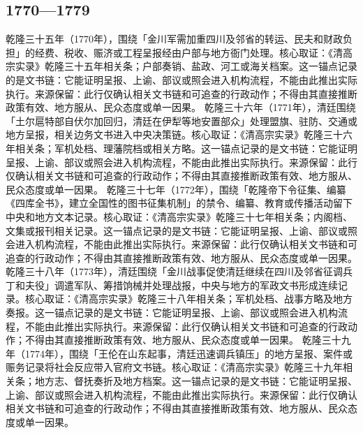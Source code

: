 \subsection{1770—1779}
乾隆三十五年（1770年），围绕「金川军需加重四川及邻省的转运、民夫和财政负担」的经费、税收、赈济或工程呈报经由户部与地方衙门处理。核心取证：《清高宗实录》乾隆三十五年相关条；户部奏销、盐政、河工或海关档案。这一锚点记录的是文书链：它能证明呈报、上谕、部议或照会进入机构流程，不能由此推出实际执行。来源保留：此行仅确认相关文书链和可追查的行政动作；不得由其直接推断政策有效、地方服从、民众态度或单一因果。
乾隆三十六年（1771年），清廷围绕「土尔扈特部自伏尔加回归，清廷在伊犁等地安置部众」处理盟旗、驻防、交通或地方呈报，相关边务文书进入中央决策链。核心取证：《清高宗实录》乾隆三十六年相关条；军机处档、理藩院档或相关方略。这一锚点记录的是文书链：它能证明呈报、上谕、部议或照会进入机构流程，不能由此推出实际执行。来源保留：此行仅确认相关文书链和可追查的行政动作；不得由其直接推断政策有效、地方服从、民众态度或单一因果。
乾隆三十七年（1772年），围绕「乾隆帝下令征集、编纂《四库全书》，建立全国性的图书征集机制」的禁令、编纂、教育或传播活动留下中央和地方文本记录。核心取证：《清高宗实录》乾隆三十七年相关条；内阁档、文集或报刊相关记录。这一锚点记录的是文书链：它能证明呈报、上谕、部议或照会进入机构流程，不能由此推出实际执行。来源保留：此行仅确认相关文书链和可追查的行政动作；不得由其直接推断政策有效、地方服从、民众态度或单一因果。
乾隆三十八年（1773年），清廷围绕「金川战事促使清廷继续在四川及邻省征调兵丁和夫役」调遣军队、筹措饷械并处理战报，中央与地方的军政文书形成连续记录。核心取证：《清高宗实录》乾隆三十八年相关条；军机处档、战事方略及地方奏报。这一锚点记录的是文书链：它能证明呈报、上谕、部议或照会进入机构流程，不能由此推出实际执行。来源保留：此行仅确认相关文书链和可追查的行政动作；不得由其直接推断政策有效、地方服从、民众态度或单一因果。
乾隆三十九年（1774年），围绕「王伦在山东起事，清廷迅速调兵镇压」的地方呈报、案件或赈务记录将社会反应带入官府文书链。核心取证：《清高宗实录》乾隆三十九年相关条；地方志、督抚奏折及地方档案。这一锚点记录的是文书链：它能证明呈报、上谕、部议或照会进入机构流程，不能由此推出实际执行。来源保留：此行仅确认相关文书链和可追查的行政动作；不得由其直接推断政策有效、地方服从、民众态度或单一因果。
